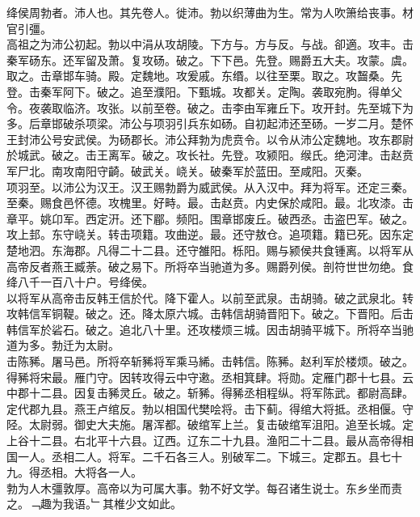 \documentclass{zhvt-classic}
\begin{document}
\hspace*{2em}绛侯周勃者。沛人也。其先卷人。徙沛。勃以织薄曲为生。常为人吹箫给丧事。材官引彊。\\
\hspace*{2em}高祖之为沛公初起。勃以中涓从攻胡陵。下方与。方与反。与战。卻適。攻丰。击秦军砀东。还军留及萧。复攻砀。破之。下下邑。先登。赐爵五大夫。攻蒙。虞。取之。击章邯车骑。殿。定魏地。攻爰戚。东缗。以往至栗。取之。攻齧桑。先登。击秦军阿下。破之。追至濮阳。下甄城。攻都关。定陶。袭取宛朐。得单父令。夜袭取临济。攻张。以前至卷。破之。击李由军雍丘下。攻开封。先至城下为多。后章邯破杀项梁。沛公与项羽引兵东如砀。自初起沛还至砀。一岁二月。楚怀王封沛公号安武侯。为砀郡长。沛公拜勃为虎贲令。以令从沛公定魏地。攻东郡尉於城武。破之。击王离军。破之。攻长社。先登。攻颍阳。缑氏。绝河津。击赵贲军尸北。南攻南阳守齮。破武关。峣关。破秦军於蓝田。至咸阳。灭秦。\\
\hspace*{2em}项羽至。以沛公为汉王。汉王赐勃爵为威武侯。从入汉中。拜为将军。还定三秦。至秦。赐食邑怀德。攻槐里。好畤。最。击赵贲。内史保於咸阳。最。北攻漆。击章平。姚卬军。西定汧。还下郿。频阳。围章邯废丘。破西丞。击盗巴军。破之。攻上邽。东守峣关。转击项籍。攻曲逆。最。还守敖仓。追项籍。籍已死。因东定楚地泗。东海郡。凡得二十二县。还守雒阳。栎阳。赐与颍侯共食锺离。以将军从高帝反者燕王臧荼。破之易下。所将卒当驰道为多。赐爵列侯。剖符世世勿绝。食绛八千一百八十户。号绛侯。\\
\hspace*{2em}以将军从高帝击反韩王信於代。降下霍人。以前至武泉。击胡骑。破之武泉北。转攻韩信军铜鞮。破之。还。降太原六城。击韩信胡骑晋阳下。破之。下晋阳。后击韩信军於硰石。破之。追北八十里。还攻楼烦三城。因击胡骑平城下。所将卒当驰道为多。勃迁为太尉。\\
\hspace*{2em}击陈豨。屠马邑。所将卒斩豨将军乘马絺。击韩信。陈豨。赵利军於楼烦。破之。得豨将宋最。雁门守。因转攻得云中守遫。丞相箕肆。将勋。定雁门郡十七县。云中郡十二县。因复击豨灵丘。破之。斩豨。得豨丞相程纵。将军陈武。都尉高肆。定代郡九县。燕王卢绾反。勃以相国代樊哙将。击下蓟。得绾大将抵。丞相偃。守陉。太尉弱。御史大夫施。屠浑都。破绾军上兰。复击破绾军沮阳。追至长城。定上谷十二县。右北平十六县。辽西。辽东二十九县。渔阳二十二县。最从高帝得相国一人。丞相二人。将军。二千石各三人。别破军二。下城三。定郡五。县七十九。得丞相。大将各一人。\\
\hspace*{2em}勃为人木彊敦厚。高帝以为可属大事。勃不好文学。每召诸生说士。东乡坐而责之。﹁趣为我语。﹂其椎少文如此。\\
\end{document}
